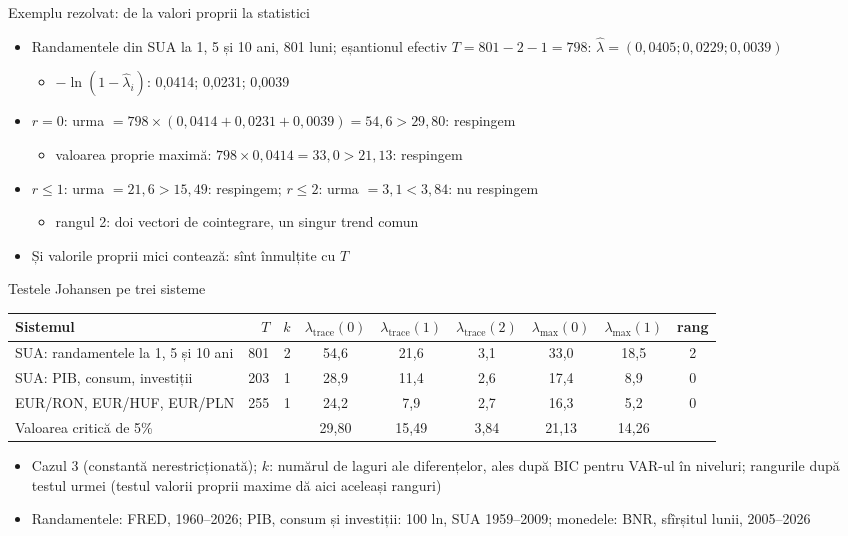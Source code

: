 \begin{frame}{Exemplu rezolvat: de la valori proprii la statistici}
\itemsize{\small}
\begin{itemize}
    \item Randamentele din SUA la 1, 5 și 10 ani, 801 luni; eșantionul efectiv $T = 801 - 2 - 1 = 798$: $\hat\lambda = (0{,}0405; 0{,}0229; 0{,}0039)$
    \begin{itemize}
        \item $-\ln(1 - \hat\lambda_i)$: 0{,}0414; 0{,}0231; 0{,}0039
    \end{itemize}
    \item $r = 0$: urma $= 798 \times (0{,}0414 + 0{,}0231 + 0{,}0039) = 54{,}6 > 29{,}80$: respingem
    \begin{itemize}
        \item valoarea proprie maximă: $798 \times 0{,}0414 = 33{,}0 > 21{,}13$: respingem
    \end{itemize}
    \item $r \le 1$: urma $= 21{,}6 > 15{,}49$: respingem; \quad $r \le 2$: urma $= 3{,}1 < 3{,}84$: nu respingem
    \begin{itemize}
        \item rangul 2: doi vectori de cointegrare, un singur trend comun
    \end{itemize}
    \item Și valorile proprii mici contează: sînt înmulțite cu $T$
\end{itemize}
\end{frame}

\begin{frame}{Testele Johansen pe trei sisteme}
\itemsize{\small}
\begin{center}
\scriptsize
\begin{tabular}{lrrcccccc}
\toprule
\textbf{Sistemul} & $T$ & $k$ & $\lambda_{\mathrm{trace}}(0)$ & $\lambda_{\mathrm{trace}}(1)$ & $\lambda_{\mathrm{trace}}(2)$ & $\lambda_{\max}(0)$ & $\lambda_{\max}(1)$ & \textbf{rang} \\
\midrule
SUA: randamentele la 1, 5 și 10 ani & 801 & 2 & 54{,}6 & 21{,}6 & 3{,}1 & 33{,}0 & 18{,}5 & 2 \\
SUA: PIB, consum, investiții & 203 & 1 & 28{,}9 & 11{,}4 & 2{,}6 & 17{,}4 & 8{,}9 & 0 \\
EUR/RON, EUR/HUF, EUR/PLN & 255 & 1 & 24{,}2 & 7{,}9 & 2{,}7 & 16{,}3 & 5{,}2 & 0 \\
Valoarea critică de 5\% & & & 29{,}80 & 15{,}49 & 3{,}84 & 21{,}13 & 14{,}26 & \\
\bottomrule
\end{tabular}
\end{center}
\begin{itemize}
    \item Cazul 3 (constantă nerestricționată); $k$: numărul de laguri ale diferențelor, ales după BIC pentru VAR-ul în niveluri; rangurile după testul urmei (testul valorii proprii maxime dă aici aceleași ranguri)
    \item Randamentele: FRED, 1960--2026; PIB, consum și investiții: 100 ln, SUA 1959--2009; monedele: BNR, sfîrșitul lunii, 2005--2026
\end{itemize}
\end{frame}

